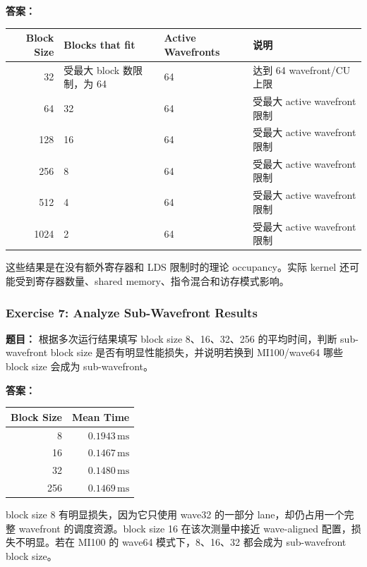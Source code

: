 \documentclass[10pt,a4paper]{article}
\begin{document}
\noindent\textbf{答案：}
\begin{center}
\small
\begin{tabular}{rlll}
\toprule
Block Size & Blocks that fit & Active Wavefronts & 说明 \\
\midrule
32 & 受最大 block 数限制，为 64 & 64 & 达到 64 wavefront/CU 上限 \\
64 & 32 & 64 & 受最大 active wavefront 限制 \\
128 & 16 & 64 & 受最大 active wavefront 限制 \\
256 & 8 & 64 & 受最大 active wavefront 限制 \\
512 & 4 & 64 & 受最大 active wavefront 限制 \\
1024 & 2 & 64 & 受最大 active wavefront 限制 \\
\bottomrule
\end{tabular}
\end{center}
这些结果是在没有额外寄存器和 LDS 限制时的理论 occupancy。实际 kernel 还可能受到寄存器数量、shared memory、指令混合和访存模式影响。

\subsubsection{Exercise 7: Analyze Sub-Wavefront Results}
\noindent\textbf{题目：} 根据多次运行结果填写 block size 8、16、32、256 的平均时间，判断 sub-wavefront block size 是否有明显性能损失，并说明若换到 MI100/wave64 哪些 block size 会成为 sub-wavefront。

\noindent\textbf{答案：}
\begin{center}
\small
\begin{tabular}{rr}
\toprule
Block Size & Mean Time \\
\midrule
8 & $0.1943\,\mathrm{ms}$ \\
16 & $0.1467\,\mathrm{ms}$ \\
32 & $0.1480\,\mathrm{ms}$ \\
256 & $0.1469\,\mathrm{ms}$ \\
\bottomrule
\end{tabular}
\end{center}
block size 8 有明显损失，因为它只使用 wave32 的一部分 lane，却仍占用一个完整 wavefront 的调度资源。block size 16 在该次测量中接近 wave-aligned 配置，损失不明显。若在 MI100 的 wave64 模式下，8、16、32 都会成为 sub-wavefront block size。
\end{document}
